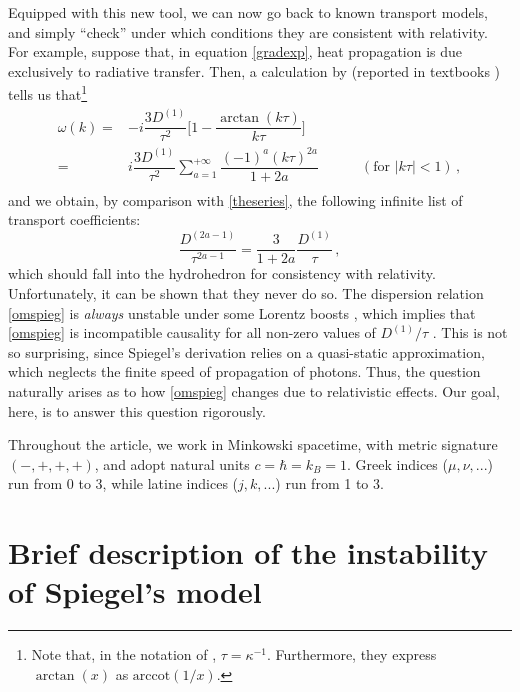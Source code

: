 \documentclass[a4paper, amsfonts, amssymb, amsmath, reprint, showkeys, nofootinbib, twoside,notitlepage,onecolumn]{revtex4-2}
\newcommand{\spc}{\quad \quad \quad}
\theoremstyle{definition}
\theoremstyle{theorem}
\theoremstyle{corollary}
\begin{document}
Equipped with this new tool, we can now go back to known transport models, and simply ``check'' under which conditions they are consistent with relativity. For example, suppose that, in equation  \eqref{gradexp}, heat propagation is due exclusively to radiative transfer. Then, a calculation by \citet{Spiegel1957} (reported in textbooks \cite[\S 100]{mihalas_book}) tells us that\footnote{Note that, in the notation of \citet{Spiegel1957}, $\tau=\kappa^{-1}$. Furthermore, they express $\arctan(x)$ as $\text{arccot}(1/x)$.}
\begin{equation}\label{omspieg}
\begin{split}
\omega(k)={}& -i \dfrac{3D^{(1)}}{\tau^2} \bigg[1-\dfrac{\arctan(k\tau)}{k\tau} \bigg] \\ 
={}& i \dfrac{3D^{(1)}}{\tau^2} \sum_{a=1}^{+\infty} \dfrac{(-1)^a (k\tau)^{2a}}{1{+}2a}  \spc (\text{for }|k\tau|<1) \, , \\
\end{split}
\end{equation}
and we obtain, by comparison with \eqref{theseries}, the following infinite list of transport coefficients:
\begin{equation}\label{D2am1}
\dfrac{D^{(2a-1)}}{\tau^{2a-1}}=\dfrac{3}{1{+}2a} \dfrac{D^{(1)}}{\tau} \, ,
\end{equation}
which should fall into the hydrohedron for consistency with relativity.
Unfortunately, it can be shown that they never do so. The dispersion relation \eqref{omspieg} is \textit{always} unstable under some Lorentz boosts \cite{GavassinoDispRadiation2024cqw}, which implies that \eqref{omspieg} is incompatible causality for all non-zero values of $D^{(1)}/\tau$ \cite{GavassinoSuperluminal2021}. This is not so surprising, since Spiegel's derivation relies on a quasi-static approximation, which neglects the finite speed of propagation of photons. Thus, the question naturally arises as to how \eqref{omspieg} changes due to relativistic effects. Our goal, here, is to answer this question rigorously. 

Throughout the article, we work in Minkowski spacetime, with metric signature $(-,+,+,+)$, and adopt natural units $c=\hbar=k_B=1$. Greek indices ($\mu,\nu,...$) run from $0$ to $3$, while latine indices ($j,k,...$) run from 1 to 3.

\vspace{-0.4cm}
\section{Brief description of the instability of Spiegel's model}\label{iunstubuzzuz}
\vspace{-0.3cm}
\end{document}
